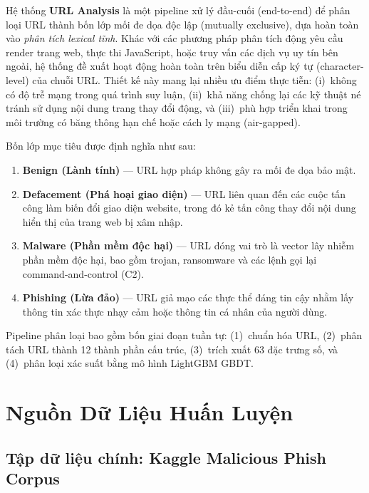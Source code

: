 \documentclass[a4paper,12pt]{article}
\begin{document}
Hệ thống \textbf{URL Analysis} là một pipeline xử lý đầu-cuối (end-to-end) để phân loại URL thành bốn lớp mối đe dọa độc lập (mutually exclusive), dựa hoàn toàn vào \textit{phân tích lexical tĩnh}. Khác với các phương pháp phân tích động yêu cầu render trang web, thực thi JavaScript, hoặc truy vấn các dịch vụ uy tín bên ngoài, hệ thống đề xuất hoạt động hoàn toàn trên biểu diễn cấp ký tự (character-level) của chuỗi URL. Thiết kế này mang lại nhiều ưu điểm thực tiễn: (i)~không có độ trễ mạng trong quá trình suy luận, (ii)~khả năng chống lại các kỹ thuật né tránh sử dụng nội dung trang thay đổi động, và (iii)~phù hợp triển khai trong môi trường có băng thông hạn chế hoặc cách ly mạng (air-gapped).

Bốn lớp mục tiêu được định nghĩa như sau:
\begin{enumerate}[label=(\roman*)]
    \item \textbf{Benign (Lành tính)} --- URL hợp pháp không gây ra mối đe dọa bảo mật.
    \item \textbf{Defacement (Phá hoại giao diện)} --- URL liên quan đến các cuộc tấn công làm biến đổi giao diện website, trong đó kẻ tấn công thay đổi nội dung hiển thị của trang web bị xâm nhập.
    \item \textbf{Malware (Phần mềm độc hại)} --- URL đóng vai trò là vector lây nhiễm phần mềm độc hại, bao gồm trojan, ransomware và các lệnh gọi lại command-and-control (C2).
    \item \textbf{Phishing (Lừa đảo)} --- URL giả mạo các thực thể đáng tin cậy nhằm lấy thông tin xác thực nhạy cảm hoặc thông tin cá nhân của người dùng.
\end{enumerate}

Pipeline phân loại bao gồm bốn giai đoạn tuần tự: (1)~chuẩn hóa URL, (2)~phân tách URL thành 12 thành phần cấu trúc, (3)~trích xuất 63 đặc trưng số, và (4)~phân loại xác suất bằng mô hình LightGBM GBDT.

\section{Nguồn Dữ Liệu Huấn Luyện}
\label{sec:data}

\subsection{Tập dữ liệu chính: Kaggle Malicious Phish Corpus}
\end{document}

